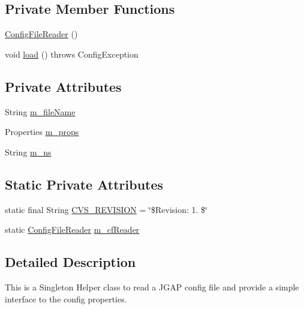 \subsection*{Private Member Functions}
\begin{DoxyCompactItemize}
\item 
\hyperlink{classorg_1_1jgap_1_1data_1_1config_1_1_config_file_reader_a37bb26a0c831ae736b7c3f550ba24b21}{Config\-File\-Reader} ()
\item 
void \hyperlink{classorg_1_1jgap_1_1data_1_1config_1_1_config_file_reader_a50116b5544a793526c73ea1953a675ef}{load} ()  throws Config\-Exception 
\end{DoxyCompactItemize}
\subsection*{Private Attributes}
\begin{DoxyCompactItemize}
\item 
String \hyperlink{classorg_1_1jgap_1_1data_1_1config_1_1_config_file_reader_a7e2e6cff08e2d75660108785ed3273c9}{m\-\_\-file\-Name}
\item 
Properties \hyperlink{classorg_1_1jgap_1_1data_1_1config_1_1_config_file_reader_af8dfcbd537624adbb3c1caa718ba0f5f}{m\-\_\-props}
\item 
String \hyperlink{classorg_1_1jgap_1_1data_1_1config_1_1_config_file_reader_a2dcdea1bf656cc0d26988910118d5a0c}{m\-\_\-ns}
\end{DoxyCompactItemize}
\subsection*{Static Private Attributes}
\begin{DoxyCompactItemize}
\item 
static final String \hyperlink{classorg_1_1jgap_1_1data_1_1config_1_1_config_file_reader_a56f38aafb001e64d57bc443040cc9f1b}{C\-V\-S\-\_\-\-R\-E\-V\-I\-S\-I\-O\-N} = \char`\"{}\$Revision\-: 1. \$\char`\"{}
\item 
static \hyperlink{classorg_1_1jgap_1_1data_1_1config_1_1_config_file_reader}{Config\-File\-Reader} \hyperlink{classorg_1_1jgap_1_1data_1_1config_1_1_config_file_reader_ad2f45ac322434ebc63c0eb354b2345ed}{m\-\_\-cf\-Reader}
\end{DoxyCompactItemize}


\subsection{Detailed Description}
This is a Singleton Helper class to read a J\-G\-A\-P config file and provide a simple interface to the config properties.

